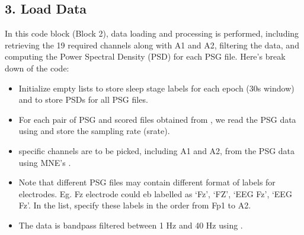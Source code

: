 \documentclass[letterpaper,10pt,english]{sphinxmanual}
\begin{document}
\subsection{3. Load Data}
\label{\detokenize{code:load-data}}
\sphinxAtStartPar
In this code block (Block 2), data loading and processing is performed, including retrieving the 19 required channels along with A1 and A2, filtering the data, and computing the Power Spectral Density (PSD) for each PSG file. Here’s break down of the code:

\sphinxAtStartPar
{}
\begin{itemize}
\item {} 
\sphinxAtStartPar
Initialize empty lists  to store sleep stage labels for each epoch (30s window) and  to store PSDs for all PSG files.

\item {} 
\sphinxAtStartPar
For each pair of PSG and scored files obtained from , we read the PSG data using  and store the sampling rate (srate).

\end{itemize}

\sphinxAtStartPar
{}
\begin{itemize}
\item {} 
 specific channels are to be picked, including A1 and A2, from the PSG data using MNE’s .

\item {} 
\sphinxAtStartPar
Note that different PSG files may contain different format of labels for electrodes. Eg. Fz electrode could eb labelled as\sphinxhyphen{} ‘Fz’, ‘FZ’, ‘EEG Fz’, ‘EEG Fz’. In the  list, specify these labels in the order from Fp1 to A2.

\item {} 
\sphinxAtStartPar
The data is bandpass filtered between 1 Hz and 40 Hz using .

\end{itemize}
\end{document}
